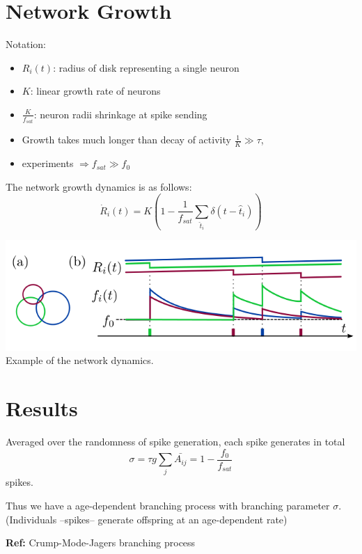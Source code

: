 \documentclass[xcolor=dvipsnames, professionalfont]{beamer}
\begin{document}
	\section*{Network Growth}
	\begin{frame}
		Notation:
		\begin{itemize}
			\item $R_i(t)$: radius of disk representing a single neuron
			\item $K$: linear growth rate of neurons
			\item $\frac{K}{f_{sat}}$: neuron radii shrinkage at spike sending
			\item Growth takes much longer than decay of
activity $\frac{1}{K} \gg \tau$,
			\item experiments $\Rightarrow f_{sat} \gg f_0$
		\end{itemize}
	\pause
	The network growth dynamics is as follows:
	\begin{equation}
		\dot{R}_i(t) = K \left( 1 - \frac{1}{f_{sat}} \sum_{\hat{t}_i} \delta(t - \hat{t}_i) \right)
	\end{equation}
	\end{frame}
	
	\begin{frame}
		\includegraphics[width=\linewidth]{img/example.png}
		Example of the network dynamics.
	\end{frame}
	
	\section{Results}
	\begin{frame}
		Averaged over the randomness of spike generation, each spike generates in total 
		\begin{equation}
			\sigma = \tau g \sum_j \bar{A_{ij}} = 1 - \frac{f_{0}}{f_{sat}}
		\end{equation}
	spikes.
	
	Thus we have a age-dependent branching process with branching parameter $\sigma$.  (Individuals --spikes-- generate offspring at an age-dependent rate) 
	
	\textbf{Ref:} Crump-Mode-Jagers branching process
	
	\end{frame}
\end{document}

